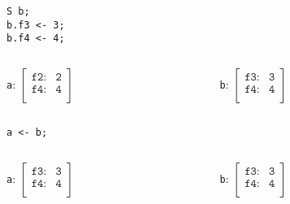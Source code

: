 \documentclass[11pt]{beamer}
\begin{document}
\begin{frame}[fragile]
\begin{lstlisting}[language=lekta]
S b;
b.f3 <- 3;
b.f4 <- 4;
\end{lstlisting}
\small
\vspace{-10pt}
\begin{columns}
	\begin{column}{0.5\textwidth}
		\begin{center}
			\texttt{a}: $\begin{bmatrix}
																				\texttt{f2:}      & \texttt{2}\\ 
																				\texttt{f4:}     	& \texttt{4}\\ 
																			\end{bmatrix}$
		\end{center}
	\end{column}
	\begin{column}{0.5\textwidth}
		\begin{center}
			\texttt{b}: $\begin{bmatrix}
																				\texttt{f3:}      & \texttt{3}\\ 
																				\texttt{f4:}     	& \texttt{4}\\ 
																			\end{bmatrix}$
		\end{center}
	\end{column}
\end{columns}
\begin{center}
\texttt{a <- b;}
\end{center}
\vspace{-30pt}
\begin{columns}
	\begin{column}{0.5\textwidth}
		\begin{center}
			\texttt{a}: $\begin{bmatrix}
																				\texttt{f3:}      & \texttt{3}\\ 
																				\texttt{f4:}     	& \texttt{4}\\ 
																			\end{bmatrix}$
		\end{center}
	\end{column}
	\begin{column}{0.5\textwidth}
		\begin{center}
			\texttt{b}: $\begin{bmatrix}
																				\texttt{f3:}      & \texttt{3}\\ 
																				\texttt{f4:}     	& \texttt{4}\\ 
																			\end{bmatrix}$
		\end{center}
	\end{column}
\end{columns}
\end{frame}
\end{document}
